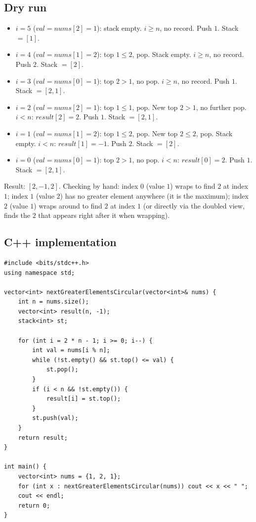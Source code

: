 \subsection*{Dry run}


\begin{itemize}
  \item $i=5$ ($\textit{val}=\textit{nums}[2]=1$): stack empty. $i\ge n$,
        no record. Push $1$. Stack $=[1]$.
  \item $i=4$ ($\textit{val}=\textit{nums}[1]=2$): top $1\le2$, pop.
        Stack empty. $i\ge n$, no record. Push $2$. Stack $=[2]$.
  \item $i=3$ ($\textit{val}=\textit{nums}[0]=1$): top $2>1$, no pop.
        $i\ge n$, no record. Push $1$. Stack $=[2,1]$.
  \item $i=2$ ($\textit{val}=\textit{nums}[2]=1$): top $1\le1$, pop.
        New top $2>1$, no further pop. $i<n$: $\textit{result}[2]=2$.
        Push $1$. Stack $=[2,1]$.
  \item $i=1$ ($\textit{val}=\textit{nums}[1]=2$): top $1\le2$, pop. New
        top $2\le2$, pop. Stack empty. $i<n$:
        $\textit{result}[1]=-1$. Push $2$. Stack $=[2]$.
  \item $i=0$ ($\textit{val}=\textit{nums}[0]=1$): top $2>1$, no pop.
        $i<n$: $\textit{result}[0]=2$. Push $1$. Stack $=[2,1]$.
\end{itemize}

Result: $[2,-1,2]$. Checking by hand: index $0$ (value $1$) wraps to find
$2$ at index $1$; index $1$ (value $2$) has no greater element anywhere
(it is the maximum); index $2$ (value $1$) wraps around to find $2$ at
index $1$ (or directly via the doubled view, finds the $2$ that appears
right after it when wrapping).

\subsection*{C++ implementation}

\begin{lstlisting}
#include <bits/stdc++.h>
using namespace std;

vector<int> nextGreaterElementsCircular(vector<int>& nums) {
    int n = nums.size();
    vector<int> result(n, -1);
    stack<int> st;

    for (int i = 2 * n - 1; i >= 0; i--) {
        int val = nums[i % n];
        while (!st.empty() && st.top() <= val) {
            st.pop();
        }
        if (i < n && !st.empty()) {
            result[i] = st.top();
        }
        st.push(val);
    }
    return result;
}

int main() {
    vector<int> nums = {1, 2, 1};
    for (int x : nextGreaterElementsCircular(nums)) cout << x << " ";
    cout << endl;
    return 0;
}
\end{lstlisting}

